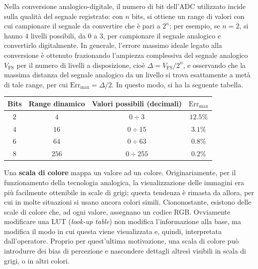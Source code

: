 \documentclass[11pt, a4paper]{scrartcl}
\theoremstyle{style}
\theoremstyle{style1}
\numberwithin{equation}{subsection}
\begin{document}
Nella conversione analogico-digitale, il numero di bit dell'ADC utilizzato incide sulla qualit\`a del segnale registrato: con $n$ bits, si ottiene un range di valori con cui campionare il segnale da convertire che \`e pari a $2^n$; per esempio, se $n=2$, si hanno $4$ livelli possibili, da $0$ a $3$, per campionare il segnale analogico e convertirlo digitalmente.
In generale, l'errore massimo ideale legato alla conversione \`e ottenuto frazionando l'ampiezza complessiva del segnale analogico $V_\text{FS}$ per il numero di livelli a disposizione, cio\`e $\Delta = V_\text{FS}/2^n$, e osservando che la massima distanza del segnale analogico da un livello si trova esattamente a met\`a di tale range, per cui $\text{Err}_\text{max} = \Delta  / 2$.
In questo modo, si ha la seguente tabella.
\begin{table}[h!]
	\centering
	\begin{tabular}{c c c c}
		Bits & Range dinamico & Valori possibili (decimali) & $\text{Err}_\text{max}$\\
	\hline
		$2$ & $ 4$ & $0\div 3$ & $12.5 \%$\\
		$4$ & $16$ & $0\div 15$ & $3.1 \%$\\
		$6$ & $ 64$ & $0\div 63$ & $0.8 \%$\\
		$8$ & $256$ & $0\div 255$ & $0.2 \%$\\
	\hline
	\end{tabular}
\end{table}

Una \textbf{scala di colore} mappa un valore ad un colore.
Originariamente, per il funzionamento della tecnologia analogica, la visualizzazione delle immagini era pi\`u facilmente ottenibile in scale di grigi; questa tendenza \`e rimasta da allora, per cui in molte situazioni si usano ancora colori simili.
Ciononostante, esistono delle scale di colore che, ad ogni valore, assegnano un codice RGB.
Ovviamente modificare una LUT (\textit{look-up table}) non modifica l'informazione alla base, ma modifica il modo in cui questa viene visualizzata e, quindi, interpretata dall'operatore.
Proprio per quest'ultima motivazione, una scala di colore pu\`o introdurre dei bias di percezione e nascondere dettagli altres\`i visibili in scala di grigi, o in altri colori.
\end{document}
